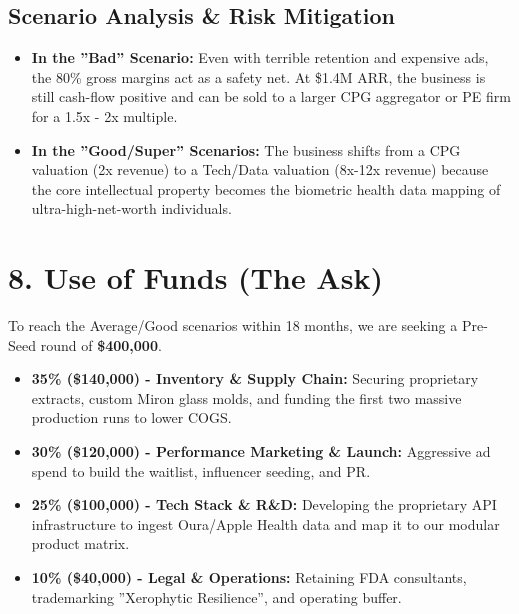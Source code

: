 \documentclass[11pt,a4paper]{article}
\begin{document}
\subsection{Scenario Analysis \& Risk Mitigation}
\begin{itemize}
    \item \textbf{In the ''Bad'' Scenario:} Even with terrible retention and expensive ads, the 80\% gross margins act as a safety net. At \$1.4M ARR, the business is still cash-flow positive and can be sold to a larger CPG aggregator or PE firm for a 1.5x - 2x multiple.
    \item \textbf{In the ''Good/Super'' Scenarios:} The business shifts from a CPG valuation (2x revenue) to a Tech/Data valuation (8x-12x revenue) because the core intellectual property becomes the biometric health data mapping of ultra-high-net-worth individuals.
\end{itemize}

\section{8. Use of Funds (The Ask)}
To reach the Average/Good scenarios within 18 months, we are seeking a Pre-Seed round of \textbf{\$400,000}.

\begin{itemize}
    \item \textbf{35\% (\$140,000) - Inventory \& Supply Chain:} Securing proprietary extracts, custom Miron glass molds, and funding the first two massive production runs to lower COGS.
    \item \textbf{30\% (\$120,000) - Performance Marketing \& Launch:} Aggressive ad spend to build the waitlist, influencer seeding, and PR.
    \item \textbf{25\% (\$100,000) - Tech Stack \& R\&D:} Developing the proprietary API infrastructure to ingest Oura/Apple Health data and map it to our modular product matrix.
    \item \textbf{10\% (\$40,000) - Legal \& Operations:} Retaining FDA consultants, trademarking ''Xerophytic Resilience'', and operating buffer.
\end{itemize}
\end{document}
